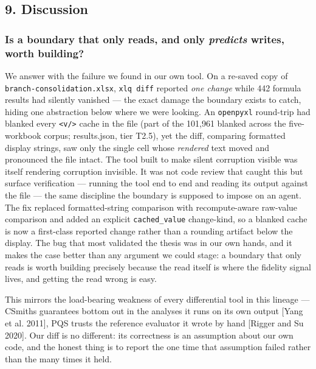 \documentclass[
]{article}
\begin{document}
\subsection{9. Discussion}\label{9-discussion}

\subsubsection{\texorpdfstring{Is a boundary that only reads, and only
\emph{predicts} writes, worth
building?}{Is a boundary that only reads, and only predicts writes, worth building?}}\label{is-a-boundary-that-only-reads-and-only-predicts-writes-worth-building}

We answer with the failure we found in our own tool. On a re-saved copy
of \texttt{branch-consolidation.xlsx}, \texttt{xlq\ diff} reported
\emph{one change} while 442 formula results had silently vanished ---
the exact damage the boundary exists to catch, hiding one abstraction
below where we were looking. An \texttt{openpyxl} round-trip had blanked
every \texttt{\textless{}v/\textgreater{}} cache in the file (part of
the 101,961 blanked across the five-workbook corpus; results.json, tier
T2.5), yet the diff, comparing formatted display strings, saw only the
single cell whose \emph{rendered} text moved and pronounced the file
intact. The tool built to make silent corruption visible was itself
rendering corruption invisible. It was not code review that caught this
but surface verification --- running the tool end to end and reading its
output against the file --- the same discipline the boundary is supposed
to impose on an agent. The fix replaced formatted-string comparison with
recompute-aware raw-value comparison and added an explicit
\texttt{cached\_value} change-kind, so a blanked cache is now a
first-class reported change rather than a rounding artifact below the
display. The bug that most validated the thesis was in our own hands,
and it makes the case better than any argument we could stage: a
boundary that only reads is worth building precisely because the read
itself is where the fidelity signal lives, and getting the read wrong is
easy.

This mirrors the load-bearing weakness of every differential tool in
this lineage --- CSmith\textquotesingle s guarantees bottom out in the
analyses it runs on its own output {[}Yang et al. 2011{]}, PQS trusts
the reference evaluator it wrote by hand {[}Rigger and Su 2020{]}. Our
diff is no different: its correctness is an assumption about our own
code, and the honest thing is to report the one time that assumption
failed rather than the many times it held.
\end{document}
